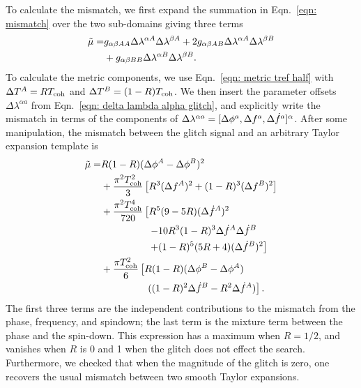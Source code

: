 \documentclass[../full_thesis/full_thesis.tex]{subfiles}
\begin{document}
To calculate the mismatch, we first expand
the summation in Eqn.~\eqref{eqn: mismatch} over the two sub-domains giving three terms
\begin{align}
\begin{split}
\tilde{\mu} = &
g_{\alpha\beta AA}\Delta\lambda^{\alpha A} \Delta\lambda^{\beta A} +
2 g_{\alpha\beta AB}\Delta\lambda^{\alpha A} \Delta\lambda^{\beta B}\\
 &  + g_{\alpha\beta BB}\Delta\lambda^{\alpha B} \Delta\lambda^{\beta B}.
\end{split}
\end{align}
To calculate the metric components, we use Eqn.~\eqref{eqn: metric tref half}
with $\Delta T^A = RT_{\mathrm{coh}}$ and $\Delta T^B = (1-R)T_{\mathrm{coh}}$.
We then insert the parameter offsets $\Delta\lambda^{\alpha a}$
from Eqn.~\eqref{eqn: delta lambda alpha glitch},
and explicitly write the mismatch in terms of the components  of $\Delta\lambda^{\alpha a}=
[\Delta\phi^{a}, \Delta f^{a}, \Delta\dot{f}^{a}]^{\alpha}$.
After some manipulation, the mismatch between the glitch signal and an arbitrary
Taylor expansion template is
\begin{align}
\begin{split}
\mutilde = & R(1-R)(\Deltaphi^A - \Deltaphi^B)^{2} \\
& + \frac{\pi^{2}\Tcoh^{2}}{3}
\left[R^{3}(\Deltanu^A)^{2} + (1-R)^{3}  (\Deltanu^B)^{2}\right] \\
& + \frac{\pi^{2} \Tcoh^{4}}{720}\left[
       R^{5}(9-5R)(\Deltanudot^A)^{2} \right. \\
       & \hspace{17mm}\left.-10R^{3}(1-R)^{3}\Deltanudot^A\Deltanudot^B \right. \\
       & \hspace{17mm}\left. + (1-R)^{5}(5R+4)(\Deltanudot^B)^{2}
                                       \right] \\
& + \frac{\pi \Tcoh^{2}}{6}\left[R(1-R)
    (\Deltaphi^B - \Deltaphi^A)\right. \\
    & \hspace{16mm} \left.((1-R)^{2}\Deltanudot^B -  R^{2}\Deltanudot^A)
                                 \right].
\end{split}
\label{eqn: mutilde fully-coherent unminimised}
\end{align}
The first three terms are the independent contributions to the
mismatch from the phase, frequency, and spindown; the last term is the mixture
term between the phase and the spin-down.  This expression has a maximum
when $R = 1/2$, and vanishes when $R$ is 0 and 1 when the glitch does not effect the
search. Furthermore, we checked that when the magnitude of the glitch is zero,
one recovers the usual mismatch between two smooth Taylor expansions.
\end{document}
